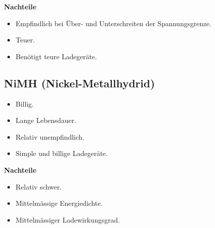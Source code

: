 \textbf {Nachteile}
\begin{itemize}
\item Empfindlich bei Über- und Unterschreiten der Spannungsgrenze.
\item Teuer.	
\item Benötigt teure Ladegeräte.	
\end{itemize}

\subsection {NiMH (Nickel-Metallhydrid)}
\begin{itemize}
\item Billig.
\item Lange Lebensdauer.
\item Relativ unempfindlich.
\item Simple und billige Ladegeräte.
\end{itemize}

\textbf {Nachteile}
\begin{itemize}
\item Relativ schwer.
\item Mittelmässige Energiedichte.
\item Mittelmässiger Ladewirkungsgrad.
\end{itemize}

